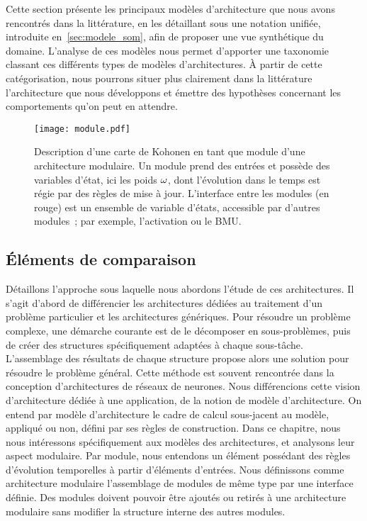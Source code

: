 \documentclass[../main]{subfiles}
\begin{document}
Cette section présente les principaux modèles d'architecture que nous avons rencontrés dans la littérature, en les détaillant sous une notation unifiée, introduite en~\ref{sec:modele_som}, afin de proposer une vue synthétique du domaine. L'analyse de ces modèles nous permet d'apporter une taxonomie classant ces différents types de modèles d'architectures. \`A partir de cette catégorisation, nous pourrons situer plus clairement dans la littérature l'architecture que nous développons et émettre des hypothèses concernant les comportements qu'on peut en attendre.

\begin{figure}
    \centering
    \texttt{[image: module.pdf]}
    \caption{Description d'une carte de Kohonen en tant que module d'une architecture modulaire. Un module prend des entrées et possède des variables d'état, ici les poids $\omega$, dont l'évolution dans le temps est régie par des règles de mise à jour. L'interface entre les modules (en rouge) est un ensemble de variable d'états, accessible par d'autres modules~; par exemple, l'activation ou le BMU. \label{fig:module}}
\end{figure}

\subsection{\'Eléments de comparaison}

Détaillons l'approche sous laquelle nous abordons l'étude de ces architectures.
Il s'agit d'abord de différencier les architectures dédiées au traitement d'un problème particulier et les architectures génériques. 
Pour résoudre un problème complexe, une démarche courante est de le décomposer en sous-problèmes, puis de créer des structures spécifiquement adaptées à chaque sous-tâche. L'assemblage des résultats de chaque structure propose alors une solution pour résoudre le problème général. Cette méthode est souvent rencontrée dans la conception d'architectures de réseaux de neurones.
Nous différencions cette vision d'architecture dédiée à une application, de la notion de modèle d'architecture.
On entend par modèle d'architecture le cadre de calcul sous-jacent au modèle, appliqué ou non, défini par ses règles de construction.
Dans ce chapitre, nous nous intéressons spécifiquement aux modèles des architectures, et analysons leur aspect modulaire.
Par module, nous entendons un élément possédant des règles d'évolution temporelles à partir d'éléments d'entrées. Nous définissons comme architecture modulaire l'assemblage de modules de même type par une interface définie. Des modules doivent pouvoir être ajoutés ou retirés à une architecture modulaire sans modifier la structure interne des autres modules.
\end{document}
